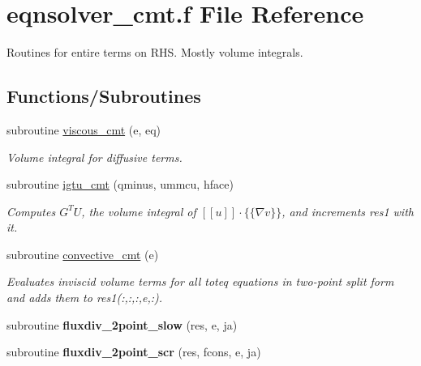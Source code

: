 \hypertarget{eqnsolver__cmt_8f}{\section{eqnsolver\-\_\-cmt.\-f File Reference}
\label{eqnsolver__cmt_8f}
}


Routines for entire terms on R\-H\-S. Mostly volume integrals.  


\subsection*{Functions/\-Subroutines}
\begin{DoxyCompactItemize}
\item 
subroutine \hyperlink{group__diffhvol_ga6d611a250fb98acf77e8a3880c0e608d}{viscous\-\_\-cmt} (e, eq)
\begin{DoxyCompactList}\small\item\em Volume integral for diffusive terms. \end{DoxyCompactList}\item 
subroutine \hyperlink{group__vsurf_ga98d826061a0ffb225d37cb73b86a9475}{igtu\-\_\-cmt} (qminus, ummcu, hface)
\begin{DoxyCompactList}\small\item\em Computes $G^T U$, the volume integral of $[[u]]\cdot\{\{\nabla v\}\}$, and increments res1 with it. \end{DoxyCompactList}\item 
subroutine \hyperlink{group__convhvol_ga77e7d7a46950fcbbf072e8e900cee272}{convective\-\_\-cmt} (e)
\begin{DoxyCompactList}\small\item\em Evaluates inviscid volume terms for all toteq equations in two-\/point split form and adds them to res1(\-:,\-:,\-:,e,\-:). \end{DoxyCompactList}\item 
\hypertarget{eqnsolver__cmt_8f_a2135bd9a2e75728f817f2b8af7124073}{subroutine {\bfseries fluxdiv\-\_\-2point\-\_\-slow} (res, e, ja)}\label{eqnsolver__cmt_8f_a2135bd9a2e75728f817f2b8af7124073}

\item 
\hypertarget{eqnsolver__cmt_8f_aff3fe4ef3d2532483001e44143232058}{subroutine {\bfseries fluxdiv\-\_\-2point\-\_\-scr} (res, fcons, e, ja)}\label{eqnsolver__cmt_8f_aff3fe4ef3d2532483001e44143232058}


\end{DoxyCompactItemize}
